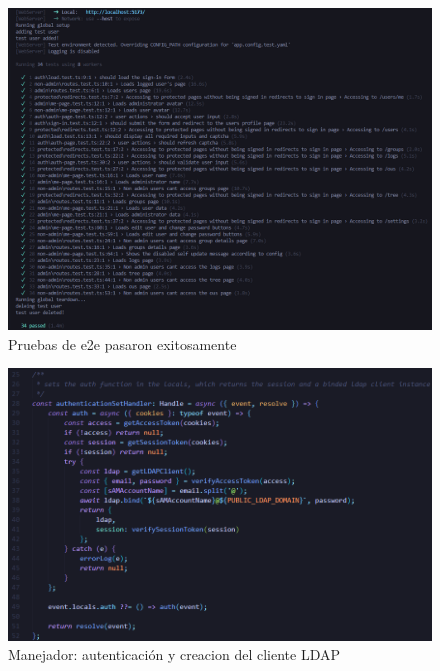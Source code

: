 \begin{figure}[h]
    \centering
    \includegraphics[width=\linewidth]{images/playwright tests run successfully.png}
    \caption{Pruebas de e2e pasaron exitosamente}
    \label{fig:e2e-test-run-ok}
\end{figure}


\begin{figure}[h]
    \centering
    \includegraphics[width=\textwidth]{images/code/authenticationSetHandler.png}
    \caption{Manejador: autenticación y creacion del cliente LDAP}
    \label{fig:authentication-set-handler}
\end{figure}

